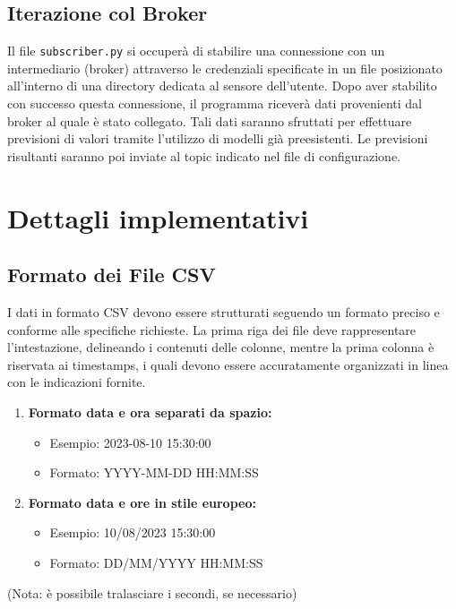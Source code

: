 \documentclass[a4paper,10pt]{article}
\begin{document}
\subsection{Iterazione col Broker}
Il file \texttt{subscriber.py} si occuperà di stabilire una connessione con un intermediario (broker) attraverso le credenziali specificate in 
un file posizionato all'interno di una directory dedicata al sensore dell'utente. Dopo aver stabilito con successo questa connessione, il programma riceverà 
dati provenienti dal broker al quale è stato collegato. Tali dati saranno sfruttati per effettuare previsioni di valori tramite l'utilizzo di modelli già preesistenti. 
Le previsioni risultanti saranno poi inviate al topic indicato nel file di configurazione.

\clearpage

\section{Dettagli implementativi}

\subsection{Formato dei File CSV}

I dati in formato CSV devono essere strutturati seguendo un formato preciso e conforme alle specifiche richieste. 
La prima riga dei file deve rappresentare l'intestazione, delineando i contenuti delle colonne, mentre la prima colonna è riservata ai timestamps, 
i quali devono essere accuratamente organizzati in linea con le indicazioni fornite.
\begin{enumerate} 
  \item \textbf{Formato data e ora separati da spazio:}
  \begin{itemize}
    \item Esempio: 2023-08-10 15:30:00
    \item Formato: YYYY-MM-DD HH:MM:SS
  \end{itemize}
  \item \textbf{Formato data e ore in stile europeo:}
  \begin{itemize}
    \item Esempio: 10/08/2023 15:30:00
    \item Formato: DD/MM/YYYY HH:MM:SS
  \end{itemize} 
\end{enumerate}

(Nota: è possibile tralasciare i secondi, se necessario)
\end{document}
